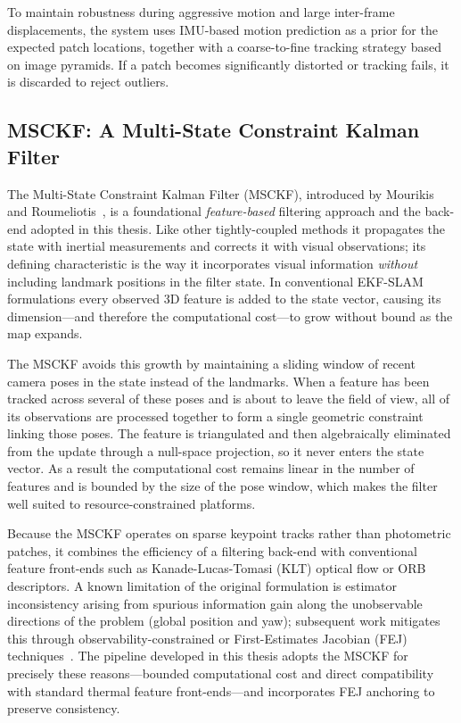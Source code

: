 To maintain robustness during aggressive motion and large inter-frame displacements, the system uses IMU-based motion prediction as a prior for the expected patch locations, together with a coarse-to-fine tracking strategy based on image pyramids. If a patch becomes significantly distorted or tracking fails, it is discarded to reject outliers.

\subsection{MSCKF: A Multi-State Constraint Kalman Filter}
The Multi-State Constraint Kalman Filter (MSCKF), introduced by Mourikis and Roumeliotis~\cite{Mourikis_2007}, is a foundational \emph{feature-based} filtering approach and the back-end adopted in this thesis. Like other tightly-coupled methods it propagates the state with inertial measurements and corrects it with visual observations; its defining characteristic is the way it incorporates visual information \emph{without} including landmark positions in the filter state. In conventional EKF-SLAM formulations every observed 3D feature is added to the state vector, causing its dimension---and therefore the computational cost---to grow without bound as the map expands.

The MSCKF avoids this growth by maintaining a sliding window of recent camera poses in the state instead of the landmarks. When a feature has been tracked across several of these poses and is about to leave the field of view, all of its observations are processed together to form a single geometric constraint linking those poses. The feature is triangulated and then algebraically eliminated from the update through a null-space projection, so it never enters the state vector. As a result the computational cost remains linear in the number of features and is bounded by the size of the pose window, which makes the filter well suited to resource-constrained platforms.

Because the MSCKF operates on sparse keypoint tracks rather than photometric patches, it combines the efficiency of a filtering back-end with conventional feature front-ends such as Kanade-Lucas-Tomasi (KLT) optical flow or ORB descriptors. A known limitation of the original formulation is estimator inconsistency arising from spurious information gain along the unobservable directions of the problem (global position and yaw); subsequent work mitigates this through observability-constrained or First-Estimates Jacobian (FEJ) techniques~\cite{Huang_2010, Li_Mourikis_2013}. The pipeline developed in this thesis adopts the MSCKF for precisely these reasons---bounded computational cost and direct compatibility with standard thermal feature front-ends---and incorporates FEJ anchoring to preserve consistency.

